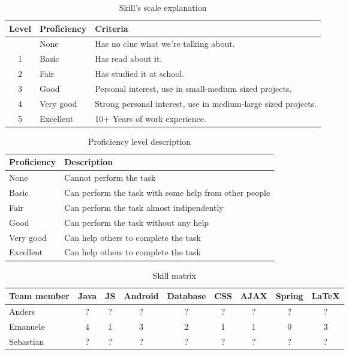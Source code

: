 \begin{table}[h]
\begin{center}
\begin{tabular}{ | c | l | l | }
  \hline
  Level & Proficiency & Criteria \\
  \hline\noalign{\smallskip}\noalign{\smallskip}\hline
  0 & None		& Has no clue what we're talking about. \\
  1 & Basic		& Has read about it.\\
  2 & Fair		& Has studied it at school.\\
  3 & Good		& Personal interest, use in small-medium sized projects.\\
  4 & Very good	& Strong personal interest, use in medium-large sized projects. \\
  5 & Excellent	& 10+ Years of work experience. \\
  \hline
\end{tabular}
\end{center}
\caption{Skill's scale explanation}
\label{table:skillscale}
\end{table}

\begin{table}[h]
\begin{center}
\begin{tabular}{ | l | l | }
  \hline
  Proficiency & Description \\
  \hline\noalign{\smallskip}\noalign{\smallskip}\hline
  None		& Cannot perform the task \\
  Basic		& Can perform the task with some help from other people \\
  Fair		& Can perform the task almost indipendently \\
  Good		& Can perform the task without any help \\
  Very good	& Can help others to complete the task \\
  Excellent	& Can help others to complete the task \\
  \hline
\end{tabular}
\end{center}
\caption{Proficiency level description}
\label{table:proficiency}
\end{table}

\begin{table}[h]
\begin{center}
\begin{tabular}{ | l | c | c | c | c | c | c | c | c | }
  \hline
  Team member & Java & JS & Android & Database & CSS & AJAX & Spring & LaTeX \\
  \hline\noalign{\smallskip}\noalign{\smallskip}\hline
  Anders & ? & ? & ? & ? & ? & ? & ? & ? \\
  Emanuele & 4 & 1 & 3 & 2 & 1 & 1 & 0 & 3 \\
  Sebastian & ? & ? & ? & ? & ? & ? & ? & ? \\
  \hline
\end{tabular}
\end{center}
\caption{Skill matrix}
\label{table:skillmatrix}
\end{table}

